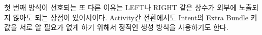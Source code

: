 첫 번째 방식이 선호되는 또 다른 이유는 LEFT나 RIGHT 같은 상수가 외부에 노출되지 않아도 되는 장점이 있어서이다. Activity간 전환에서도 Intent의 Extra Bundle 키 값을 서로 알 필요가 없게 하기 위해서 정적인 생성 방식을 사용하기도 한다.

\begin{comment}
\subsubsection{하위 클래스에서 boolean 리턴 메서드 오버라이드}
boolean을 리턴하는 메서드를 쓰는 것도 비슷하긴 하다.
 
부모 클래스에서 아래와 같이 사용한다.
	
\begin{lstlisting}[frame=single] 
	public void execute() {
		if (isAttribute1()) {
 			someOperationW();
		}
		...
	}
 
	protected boolean isAttribute1() {
		return false;
	}
\end{lstlisting}
 
하위 클래스에서 isAttributeA() 메서드를 필요할 때 오버라이드 하는 방식이다.
나도 이 방법을 쓰는 경우가 있긴 한데, marker interface는 좀 더 복잡한 케이스에 더 맞는다.\\

경우를 좀 생각해보자.
해야 할 if  문이 10개라고 하면 10개의 boolean을 리턴하는 메서드가 필요해진다.
하위 클래스에서는 어느 것에 true이고, 어느 것에 false인지를 정해주면 되는데, 갯수가 많아지면, 나중에 정책이 바뀔 때 작업에서 혼돈이 있지 않을까.\\
 
한 가지 비유를 생각해보았다.
10권의 지정된 책이 있다. 내가 속한 조직의 구성원들한테, 각 책을 갖고 있는지 여부에 따라서 뭔가를 해주고 싶다. 책을 사준다든가, 교육을 보내준다든가 하는 게 있을 것이다.\\
 
이때 각각의 boolean 리턴 메서드를 만들 수 있다. hasEffectiveJava(), hasAndroidHacks(), ...
각 구성원 클래스는 이것을 오버라이드 해서 갖고 있는 책에다 true를 리턴하게 하면 된다.\\

그런데 어느날 책 장터가 열려서 각자 갖고 있는 책들이 다 바뀌어 버렸다.
이때 또 각각 찾아서 true/false를 바꿔주면 된다.\\
 
그런데 이런 경우에 이게 더 쉽지 않을까? 책1 가지고 있는지, 책2 가지고 있는지 계속 묻는 거 보다, 자기가 갖고 있는 책만 나열하라고 하는 것이다.
boolean 메서드를 쓰는 방식이 책 각각에 대해서 묻는 것이고, marker interface를 쓰는 건 갖고 있는 것만 나열하는 방식이다.\\
 

\end{comment}
